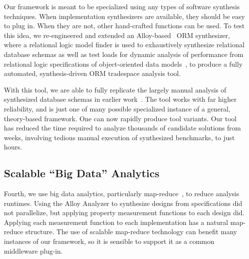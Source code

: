 Our framework is meant to be specialized using any types of software synthesis techniques. When implementation synthesizers are available, they should be easy to plug in. When they are not, other hand-crafted functions can be used. To test this idea, we re-engineered and extended an Alloy-based~\cite{daniel_jackson_alloy:lightweight_2002} ORM synthesizer, where a relational logic model finder is used to exhaustively synthesize relational database schemas as well as test loads for dynamic analysis of performance from relational logic specifications of object-oriented data models~\cite{spacemaker, trademaker}, to produce a fully automated, synthesis-driven ORM tradespace analysis tool.

With this tool, we are able to fully replicate the largely manual analysis of synthesized database schemas in earlier work~\cite{trademaker}. The tool works with far higher reliability, and is just one of many possible specialized instance of a general, theory-based framework. One can now rapidly produce tool variants. Our tool has reduced the time required to analyze thousands of candidate solutions from weeks, involving tedious manual execution of synthesized benchmarks, to just hours.

\subsection{Scalable ``Big Data'' Analytics}
Fourth, we use big data analytics, particularly map-reduce~\cite{dean2008mapreduce}, to reduce analysis runtimes. Using the Alloy Analyzer to synthesize designs from specifications did not parallelize, but applying property measurement functions to each design did. Applying each measurement function to each implementation has a natural map-reduce structure. The use of scalable map-reduce technology can benefit many instances of our framework, so it is sensible to support it as a common middleware plug-in.


